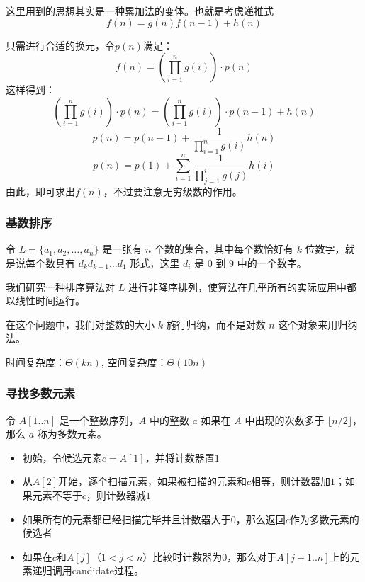 \documentclass[./../main.tex]{subfiles}
\begin{document}
这里用到的思想其实是一种累加法的变体。也就是考虑递推式
\[
    f(n)=g(n)f(n-1)+h(n)
\]

只需进行合适的换元，令$p(n)$满足：
\[
    f(n)=(\prod_{i=1}^{n}g(i))\cdot p(n)
\]
这样得到：
\[
    (\prod_{i=1}^{n}g(i))\cdot p(n)=(\prod_{i=1}^{n}g(i))\cdot p(n-1)+ h(n)
\]
\[
    p(n)=p(n-1)+\frac{1}{\prod_{i=1}^{n}g(i)}h(n)
\]
\[
    p(n)=p(1)+\sum_{i=1}^{n}\frac{1}{\prod_{j=1}^{i}g(j)}h(i)
\]
由此，即可求出$f(n)$，不过要注意无穷级数的作用。

\subsubsection{基数排序}
令 $L = \{a_{1}, a_{2}, \ldots, a_{n}\}$ 是一张有 $n$ 个数的集合，其中每个数恰好有 $k$ 位数字，就是说每个数具有 $d_{k}d_{k-1}\ldots d_{1}$ 形式，这里 $d_{i}$ 是 $0$ 到 $9$ 中的一个数字。

我们研究一种排序算法对 $L$ 进行非降序排列，使算法在几乎所有的实际应用中都以线性时间运行。

在这个问题中，我们对整数的大小 $k$ 施行归纳，而不是对数 $n$ 这个对象来用归纳法。

\begin{algorithm}[t]
    \BlankLine
    \caption{基数排序}
\end{algorithm}
时间复杂度：$\Theta(kn)$, 空间复杂度：$\Theta(10n)$

\subsubsection{寻找多数元素}
令 $A[1..n]$ 是一个整数序列，$A$ 中的整数 $a$ 如果在 $A$ 中出现的次数多于 $\lfloor n/2 \rfloor$，那么 $a$ 称为多数元素。


\begin{itemize}
    \item 初始，令候选元素$c=A[1]$，并将计数器置$1$
    \item 从$A[2]$开始，逐个扫描元素，如果被扫描的元素和$c$相等，则计数器加$1$；如果元素不等于$c$，则计数器减$1$
    \item 如果所有的元素都已经扫描完毕并且计数器大于$0$，那么返回$c$作为多数元素的候选者
    \item 如果在$c$和$A[j]$（$1<j<n$）比较时计数器为$0$，那么对于$A[j+1..n]$上的元素递归调用candidate过程。
\end{itemize}
\end{document}
